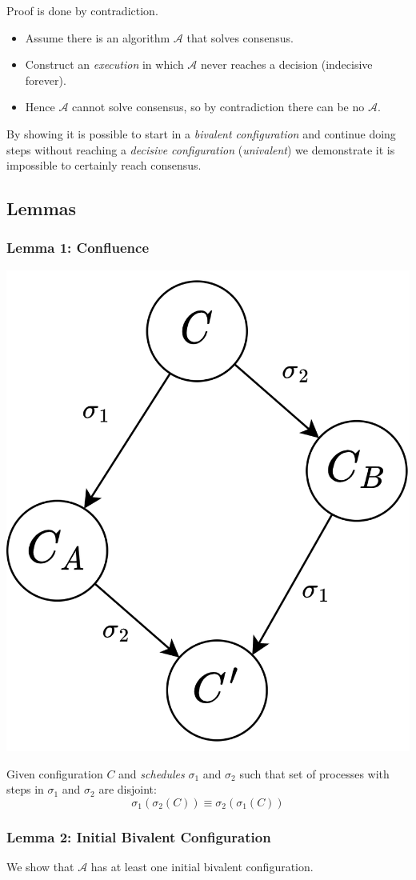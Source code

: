 Proof is done by contradiction.
\begin{itemize}
    \item Assume there is an algorithm $\mathcal{A}$ that solves consensus.
    \item Construct an \textit{execution} in which $\mathcal{A}$ never reaches a decision (indecisive forever).
    \item Hence $\mathcal{A}$ cannot solve consensus, so by contradiction there can be no $\mathcal{A}$. 
\end{itemize}
By showing it is possible to start in a \textit{bivalent configuration} and continue doing steps without reaching a \textit{decisive configuration} (\textit{univalent}) we demonstrate it is impossible to certainly reach consensus.

\subsection{Lemmas}
\subsubsection{Lemma 1: Confluence}
\begin{center}
    \includegraphics[width=.2\textwidth]{consensus/images/lemma_confluence.drawio.png}
\end{center}
Given configuration $C$ and \textit{schedules} $\sigma_1$ and $\sigma_2$ such that set of processes with steps in $\sigma_1$ and $\sigma_2$ are disjoint:
\[\sigma_1(\sigma_2(C)) \equiv \sigma_2(\sigma_1(C))\]

\subsubsection{Lemma 2: Initial Bivalent Configuration}
We show that $\mathcal{A}$ has at least one initial bivalent configuration.
\unfinished

%
% 

